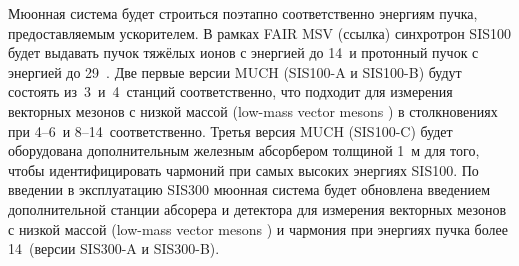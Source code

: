 
Мюонная система будет строиться поэтапно соответственно энергиям пучка, предоставляемым ускорителем. В рамках FAIR MSV (\todo ссылка) синхротрон SIS100 будет выдавать пучок тяжёлых ионов с энергией до 14~\GeVperNucl и протонный пучок с энергией до 29~\GeVperNucl. Две первые версии MUCH (SIS100-A и SIS100-B) будут состоять из~3~и~4~станций соответственно, что подходит для измерения векторных мезонов с низкой массой (low-mass vector mesons \todo) в столкновениях при 4--6~\GeVperNucl и 8--14~\GeVperNucl соответственно. Третья версия MUCH (SIS100-C) будет оборудована дополнительным железным абсорбером толщиной 1~м для того, чтобы идентифицировать чармоний при самых высоких энергиях SIS100. 
По введении в эксплуатацию SIS300 мюонная система будет обновлена введением дополнительной станции абсорера и детектора для измерения векторных мезонов с низкой массой (low-mass vector mesons \todo) и чармония при энергиях пучка более 14~\GeVperNucl (версии SIS300-A и SIS300-B).


